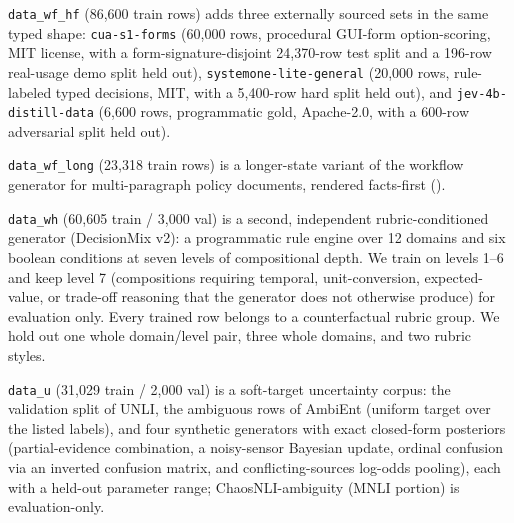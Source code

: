 \texttt{data\_wf\_hf} (86{,}600 train rows) adds three externally sourced sets in the same typed shape: \texttt{cua-s1-forms} (60{,}000 rows, procedural GUI-form
option-scoring, MIT license, with a form-signature-disjoint 24{,}370-row test split and a 196-row
real-usage demo split held out), \texttt{systemone-lite-general} (20{,}000 rows, rule-labeled typed
decisions, MIT, with a 5{,}400-row hard split held out), and \texttt{jev-4b-distill-data} (6{,}600 rows,
programmatic gold, Apache-2.0, with a 600-row adversarial split held out).

\texttt{data\_wf\_long} (23{,}318 train rows) is a longer-state variant of the workflow generator for
multi-paragraph policy documents, rendered facts-first ().

\texttt{data\_wh} (60{,}605 train / 3{,}000 val) is a second, independent rubric-conditioned generator
(DecisionMix v2): a programmatic rule engine over 12 domains and six boolean conditions at seven levels
of compositional depth. We train on levels 1--6 and keep level 7 (compositions requiring temporal,
unit-conversion, expected-value, or trade-off reasoning that the generator does not otherwise produce)
for evaluation only. Every trained row belongs to a counterfactual rubric group. We hold out one whole
domain/level pair, three whole domains, and two rubric styles.

\texttt{data\_u} (31{,}029 train / 2{,}000 val) is a soft-target uncertainty corpus: the validation split of UNLI, the ambiguous rows of AmbiEnt (uniform target over the listed
labels), and four synthetic generators with exact closed-form posteriors (partial-evidence combination, a
noisy-sensor Bayesian update, ordinal confusion via an inverted confusion matrix, and conflicting-sources
log-odds pooling), each with a held-out parameter range; ChaosNLI-ambiguity (MNLI portion) is
evaluation-only.

